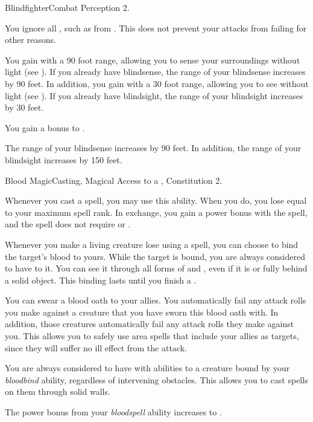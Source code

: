     \begin{feat}{Blindfighter}{Combat}
        \featpre Perception 2.

         You ignore all , such as from .
        This does not prevent your attacks from failing for other reasons.

         You gain  with a 90 foot range, allowing you to sense your surroundings without light (see ).
        If you already have blindsense, the range of your blindsense increases by 90 feet.
        In addition, you gain  with a 30 foot range, allowing you to see without light (see ).
        If you already have blindsight, the range of your blindsight increases by 30 feet.

         You gain a  bonus to .

         The range of your blindsense increases by 90 feet.
        In addition, the range of your blindsight increases by 150 feet.
    \end{feat}

    \begin{magicalfeat}{Blood Magic}{Casting, Magical}
        \featpre Access to a , Constitution 2.

         Whenever you cast a spell, you may use this ability.
        When you do, you lose  equal to your maximum spell rank.
        In exchange, you gain a  power bonus with the spell, and the spell does not require  or .

         Whenever you make a living creature lose  using a spell, you can choose to bind the target's blood to yours.
        While the target is bound, you are always considered to have  to it.
        You can see it through all forms of  and , even if it is  or fully behind a solid object.
        This binding lasts until you finish a .

         You can swear a blood oath to your allies.
        You automatically fail any attack rolls you make against a creature that you have sworn this blood oath with.
        In addition, those creatures automatically fail any attack rolls they make against you.
        This allows you to safely use area spells that include your allies as targets, since they will suffer no ill effect from the attack.

         You are always considered to have  with \magical abilities to a creature bound by your \textit{bloodbind} ability, regardless of intervening obstacles.
        This allows you to cast spells on them through solid walls.

         The power bonus from your \textit{bloodspell} ability increases to .
    \end{magicalfeat}

